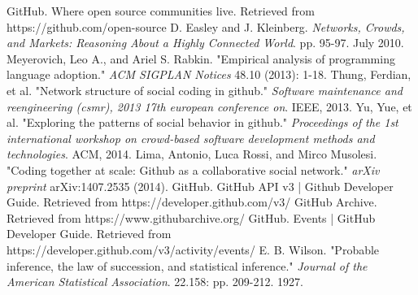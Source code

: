 \documentclass[10pt, a4paper, titlepage]{article}
\begin{document}
\begin{thebibliography}{9}
 GitHub. Where open source communities live. Retrieved from https://github.com/open-source 
 D. Easley and J. Kleinberg. \emph{Networks, Crowds, and Markets: Reasoning About a Highly Connected World}. pp. 95-97. July 2010.
 Meyerovich, Leo A., and Ariel S. Rabkin. "Empirical analysis of programming language adoption." \emph{ACM SIGPLAN Notices} 48.10 (2013): 1-18.
 Thung, Ferdian, et al. "Network structure of social coding in github." \emph{Software maintenance and reengineering (csmr), 2013 17th european conference on}. IEEE, 2013.
 Yu, Yue, et al. "Exploring the patterns of social behavior in github." \emph{Proceedings of the 1st international workshop on crowd-based software development methods and technologies}. ACM, 2014.
 Lima, Antonio, Luca Rossi, and Mirco Musolesi. "Coding together at scale: Github as a collaborative social network." \emph{arXiv preprint} arXiv:1407.2535 (2014).
 GitHub. GitHub API v3 | Github Developer Guide. Retrieved from https://developer.github.com/v3/
 GitHub Archive. Retrieved from https://www.githubarchive.org/
 GitHub. Events | GitHub Developer Guide. Retrieved from https://developer.github.com/v3/activity/events/
 E. B. Wilson. "Probable inference, the law of succession, and statistical inference." \emph{Journal of the American Statistical Association}. 22.158: pp. 209-212. 1927.


\end{thebibliography}
\end{document}
